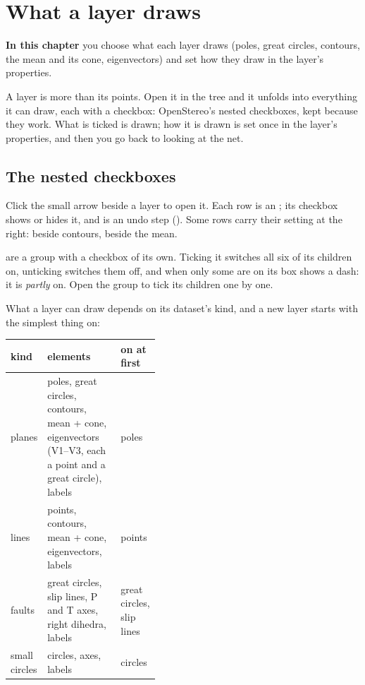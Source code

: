\chapter{What a layer draws}\label{ch:elements}
\begin{goals}
\textbf{In this chapter} you choose what each layer draws (poles, great circles, contours, the mean and
its cone, eigenvectors) and set how they draw in the layer's properties.
\end{goals}

A layer is more than its points. Open it in the tree and it unfolds into everything it can draw, each with
a checkbox: OpenStereo's nested checkboxes, kept because they work. What is ticked is drawn; how it is drawn
is set once in the layer's properties, and then you go back to looking at the net.

\section{The nested checkboxes}\label{sec:checkboxes}


Click the small arrow beside a layer to open it. Each row is an ; its checkbox shows or hides
it, and is an undo step (). Some rows carry their setting at the right:
 beside contours,  beside the mean.

 are a group with a checkbox of its own. Ticking it switches all six
of its children on, unticking switches them off, and when only some are on its box shows a dash: it is
\emph{partly} on. Open the group to tick its children one by one.

What a layer can draw depends on its dataset's kind, and a new layer starts with the simplest thing on:

\begin{center}\small
\begin{tabularx}{\linewidth}{@{}>{\raggedright}p{0.2\linewidth}L>{\raggedright\arraybackslash}p{0.22\linewidth}@{}}\toprule
\sffamily\bfseries kind & \sffamily\bfseries elements & \sffamily\bfseries on at first \\\midrule
planes & poles, great circles, contours, mean + cone, eigenvectors (V1–V3, each a point and a great circle), labels & poles \\
lines & points, contours, mean + cone, eigenvectors, labels & points \\
faults & great circles, slip lines, P and T axes, right dihedra, labels & great circles, slip lines \\
small circles & circles, axes, labels & circles \\
\bottomrule\end{tabularx}
\end{center}


